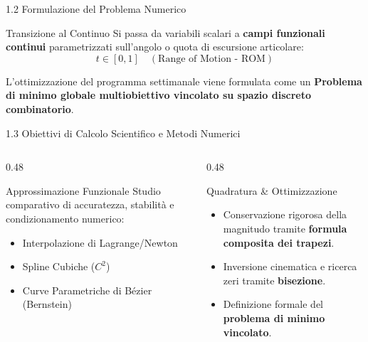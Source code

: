 \documentclass[aspectratio=169, 10pt]{beamer}
\begin{document}
\begin{frame}{1.2 Formulazione del Problema Numerico}
    \begin{block}{Transizione al Continuo}
        Si passa da variabili scalari a \textbf{campi funzionali continui} parametrizzati sull'angolo o quota di escursione articolare:
        $$t \in [0, 1] \quad (\text{Range of Motion - ROM})$$
    \end{block}
    \vspace{0.2cm}
        L'ottimizzazione del programma settimanale viene formulata come un \textbf{Problema di minimo globale multiobiettivo vincolato su spazio discreto combinatorio}.
\end{frame}

\begin{frame}{1.3 Obiettivi di Calcolo Scientifico e Metodi Numerici}
    \begin{columns}[T]
        \begin{column}{0.48\textwidth}
            \begin{block}{Approssimazione Funzionale}
                Studio comparativo di accuratezza, stabilità e condizionamento numerico:
                \begin{itemize}
                    \item Interpolazione di Lagrange/Newton
                    \item Spline Cubiche ($C^2$)
                    \item Curve Parametriche di Bézier (Bernstein)
                \end{itemize}
            \end{block}
        \end{column}
        \begin{column}{0.48\textwidth}
            \begin{block}{Quadratura \& Ottimizzazione}
                \begin{itemize}
                    \item Conservazione rigorosa della magnitudo tramite \textbf{formula composita dei trapezi}.
                    \item Inversione cinematica e ricerca zeri tramite \textbf{bisezione}.
                    \item Definizione formale del \textbf{problema di minimo vincolato}.
                \end{itemize}
            \end{block}
        \end{column}
    \end{columns}
\end{frame}
\end{document}
